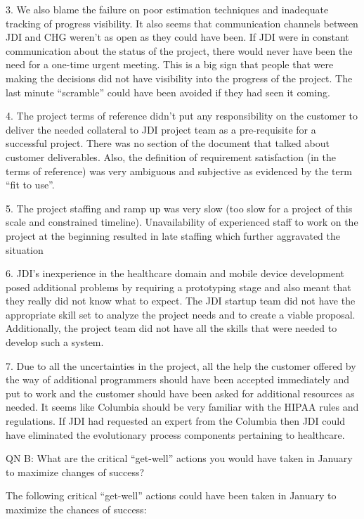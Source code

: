 \documentclass[11pt]{article}
\begin{document}
3.  We also blame the failure on poor estimation techniques and inadequate tracking of progress
visibility.  It also seems that communication channels between JDI and CHG weren't as open as they
could have been.  If JDI were in constant communication about the status of the project, there would
never have been the need for a one-time urgent meeting.  This is a big sign that people that were
making the decisions did not have visibility into the progress of the project.  The last minute
“scramble” could have been avoided if they had seen it coming.

4.  The project terms of reference didn’t put any responsibility on the customer to deliver the
needed collateral to JDI project team as a pre-requisite for a successful project.  There was no
section of the document that talked about customer deliverables.  Also, the definition of
requirement satisfaction (in the terms of reference) was very ambiguous and subjective as evidenced
by the term “fit to use”.

5.  The project staffing and ramp up was very slow (too slow for a project of this scale and
constrained timeline).  Unavailability of experienced staff to work on the project at the beginning
resulted in late staffing which further aggravated the situation

6.  JDI’s inexperience in the healthcare domain and mobile device development posed additional
problems by requiring a prototyping stage and also meant that they really did not know what to
expect.  The JDI startup team did not have the appropriate skill set to analyze the project needs
and to create a viable proposal.  Additionally, the project team did not have all the skills that
were needed to develop such a system.

7.  Due to all the uncertainties in the project, all the help the customer offered by the way of
additional programmers should have been accepted immediately and put to work and the customer should
have been asked for additional resources as needed.  It seems like Columbia should be very familiar
with the HIPAA rules and regulations.  If JDI had requested an expert from the Columbia then JDI
could have eliminated the evolutionary process components pertaining to healthcare.

QN B: What are the critical “get-well” actions you would have taken in January to maximize changes
of success?

The following critical “get-well” actions could have been taken in January to maximize the chances
of success:
\end{document}
